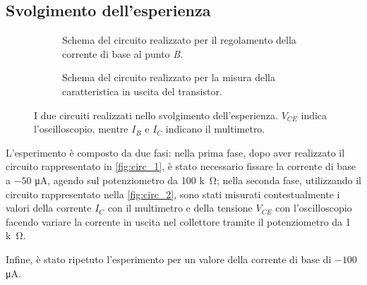 \subsection{Svolgimento dell'esperienza}
\begin{figure}[htb]
    \centering
    \begin{subfigure}{.4\textwidth}
    \centering
        
        \caption{Schema del circuito realizzato per il regolamento della corrente di base al punto \emph B.}
        \label{fig:circ_1}
    \end{subfigure}
     \hspace{1cm}
    \begin{subfigure}{.4\textwidth}
        \centering
        
        \caption{Schema del circuito realizzato per la misura della caratteristica in uscita del transistor.}
        \label{fig:circ_2}
    \end{subfigure}
    \caption{I due circuiti realizzati nello svolgimento dell'esperienza. $V_{CE}$ indica l'oscilloscopio, mentre $I_B$ e $I_C$ indicano il multimetro.}
    \label{fig:circuiti}
\end{figure}

L'esperimento è composto da due fasi: nella prima fase, dopo aver realizzato il circuito rappresentato in \autoref{fig:circ_1}, è stato necessario fissare la corrente di base a $-50$ \si{\micro\ampere}, agendo sul potenziometro da 100 \si{k\ohm}; nella seconda fase, utilizzando il circuito rappresentato nella \autoref{fig:circ_2}, sono stati misurati contestualmente i valori della corrente $I_C$ con il multimetro e della tensione $V_{CE}$ con l'oscilloscopio facendo variare la corrente in uscita nel collettore tramite il potenziometro da 1 \si{k\ohm}.

Infine, è stato ripetuto l'esperimento per un valore della corrente di base di $-100$ \si{\micro\ampere}.